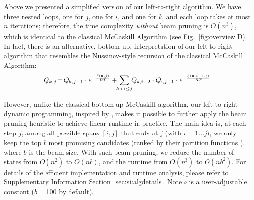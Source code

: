 Above we presented a simplified version of our left-to-right \linearpartition algorithm. %
We have 
three nested loops, one for $j$, one for $i$, and one for $k$,
and each loop takes at most $n$ iterations; %
therefore, the time complexity {\em without} beam pruning is $O(n^3)$,
which is identical to the classical McCaskill Algorithm (see Fig.~\ref{fig:overview}D).
In fact, there is an alternative, bottom-up, interpretation of our left-to-right algorithm
that resembles the Nussinov-style recursion of the classical McCaskill Algorithm:
\vspace{-0.1cm}
\[
Q_{{{k}}, {{j}}} \!=\! Q_{{{k}}, {{j-1}}} \cdot e^{-\frac{\delta(\mathbf{x}, j)}{RT}} + \!\! \sum_{k<i\leq j} \!\! {Q_{{{k}}, {{i-2}}} \cdot Q_{{{i}}, {{j-1}}}   \cdot e^{-\frac{\xi(\mathbf{x}, i-1, j)}{RT}}}
\]



However, unlike the classical bottom-up McCaskill algorithm,
our left-to-right dynamic programming, inspired by \linearfold, %
makes it possible to further apply the beam pruning heuristic
to achieve linear runtime in practice.
The main idea is, at each step $j$, among all possible spans $[i, j]$ that ends at $j$  (with $i=1...j$), 
we only keep the top $b$ most promising candidates (ranked by their partition functions ).
where $b$ is the beam size.
With such beam pruning, 
we reduce the number of states from $O(n^2)$ to $O(nb)$,
and the runtime from $O(n^3)$ to $O(nb^2)$.
For details of the efficient implementation and runtime analysis, please refer to
Supplementary Information Section~\ref{sec:si:algdetails}.
Note $b$ is a user-adjustable constant ($b=$100 by default).


